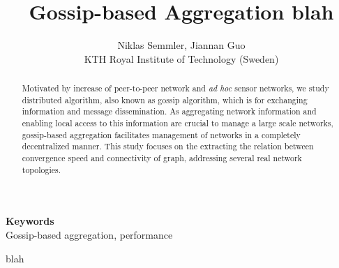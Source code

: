 \documentclass[11pt,a4paper]{article}
\date{}
\def\keywords#1{\begin{center}{\bf Keywords}\\{#1}\end{center}} %
\def\titulo#1{\title{#1}} %
\def\autores#1{\author{#1}} %
\begin{document}
\titulo{Gossip-based Aggregation blah}

\autores{
Niklas Semmler, Jiannan Guo\\
KTH Royal Institute of Technology (Sweden)\\
}%

\maketitle

\begin{abstract}
Motivated by increase of peer-to-peer network and {\it ad hoc} sensor networks, we study distributed algorithm, also known as gossip algorithm, which is for exchanging information and message dissemination. As aggregating network information and enabling local access to this information are crucial to manage a large scale networks, gossip-based aggregation facilitates management of networks in a completely decentralized manner. This study focuses on the extracting the relation between convergence speed and connectivity of graph, addressing several real network topologies.
\end{abstract}

\keywords{Gossip-based aggregation, performance}%

blah \cite{jelasity_gossip-based_2005}
\cite{massoulie_peer_2006}


\newpage

\tableofcontents

\newpage









\appendix
\end{document}
